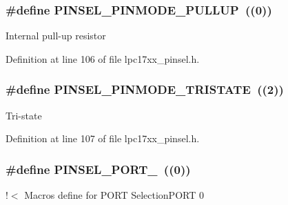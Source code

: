 \subsubsection[{\texorpdfstring{P\+I\+N\+S\+E\+L\+\_\+\+P\+I\+N\+M\+O\+D\+E\+\_\+\+P\+U\+L\+L\+UP}{PINSEL_PINMODE_PULLUP}}]{\setlength{\rightskip}{0pt plus 5cm}\#define P\+I\+N\+S\+E\+L\+\_\+\+P\+I\+N\+M\+O\+D\+E\+\_\+\+P\+U\+L\+L\+UP~((0))}\hypertarget{group___p_i_n_s_e_l___public___macros_ga2a9e1ebf0d763e08959c69866272532e}{}\label{group___p_i_n_s_e_l___public___macros_ga2a9e1ebf0d763e08959c69866272532e}
Internal pull-\/up resistor 

Definition at line 106 of file lpc17xx\+\_\+pinsel.\+h.

\subsubsection[{\texorpdfstring{P\+I\+N\+S\+E\+L\+\_\+\+P\+I\+N\+M\+O\+D\+E\+\_\+\+T\+R\+I\+S\+T\+A\+TE}{PINSEL_PINMODE_TRISTATE}}]{\setlength{\rightskip}{0pt plus 5cm}\#define P\+I\+N\+S\+E\+L\+\_\+\+P\+I\+N\+M\+O\+D\+E\+\_\+\+T\+R\+I\+S\+T\+A\+TE~((2))}\hypertarget{group___p_i_n_s_e_l___public___macros_ga6777cc9af3537a1a29dd1a577993851f}{}\label{group___p_i_n_s_e_l___public___macros_ga6777cc9af3537a1a29dd1a577993851f}
Tri-\/state 

Definition at line 107 of file lpc17xx\+\_\+pinsel.\+h.

\subsubsection[{\texorpdfstring{P\+I\+N\+S\+E\+L\+\_\+\+P\+O\+R\+T\+\_\+0}{PINSEL_PORT_0}}]{\setlength{\rightskip}{0pt plus 5cm}\#define P\+I\+N\+S\+E\+L\+\_\+\+P\+O\+R\+T\+\_~((0))}\hypertarget{group___p_i_n_s_e_l___public___macros_ga6be60e77a74899c8c3050a5c7154765a}{}\label{group___p_i_n_s_e_l___public___macros_ga6be60e77a74899c8c3050a5c7154765a}
!$<$ Macros define for P\+O\+RT Selection\+P\+O\+RT 0 

